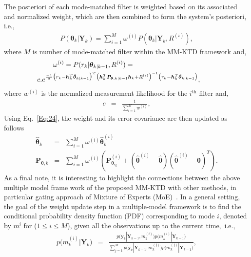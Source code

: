 \documentclass{ieeeaccess}
\def\MMK{\text{MM-KTD}}
\def\k{_{k}}
\def\i{^{i}}
\def\bt{\bm{\theta}}
\def\h{\bm{h}}
\def\P{\bm{P}}
\def\Y{\bm{Y}}
\def\pk{_{k-1}}
\def\kpk{_{k|k-1}}
\def\y{\bm{y}}
\def\i{^{(i)}}
\begin{document}
The posteriori of each mode-matched filter is weighted based on its associated and normalized  weight, which are then combined to form the system's posteriori, i.e.,
%
\begin{eqnarray}
P(\bt\k|\Y\k) =\sum_{i=1}^{M}\omega\i P(\bt\k|\Y\k, R\i), \label{Eq:24}
\end{eqnarray}
%
where $M$ is number of mode-matched filter within the $\MMK$ framework and,
%
\begin{eqnarray} \label{Eq:25}
\lefteqn{\omega\i = P(r\k|\bt\kpk,R\i)=}\\
&& \!\! \!\!\!\!\!\!\!\!\! \!\!\!\!\!\!\!\!\!  c.e^{\frac{-1}{2}\big(r\k-\h\k^T\hat{\bt}\kpk\big)^T\big(\h\k^T\P_{\bt,k|k-1}\h\k+R\i\big)^{-1}\big(r\k-\h\k^T\hat{\bt}\kpk\big)\nonumber},
\end{eqnarray}
%
where $w\i$ is the normalized measurement likelihood for the $i^{\text{th}}$ filter and,
%
\begin{eqnarray} \label{Eq:26}
c &=& \frac{1}{\sum_{i=1}^{M} w\i},
\end{eqnarray}
%
Using Eq.~\eqref{Eq:24}, the weight and its error covariance are then updated as follows
%
\begin{eqnarray}
\!\!\!\!\!\!\!\!\!\!\!\!\hat{\bt}\k &\!\!=\!\!& \sum_{i=1}^{M}\omega\i\hat{\bt}\i\k\\
\!\!\!\!\!\!\!\!\!\!\!\!\P_{\bt,k} &\!\!=\!\!& \sum_{i=1}^{M}\omega\i\left(\P_{\bt,\k}\i + (\hat{\bt}\i-\hat{\bt})(\hat{\bt}\i-\hat{\bt})^T \right).\label{Eq:New28}
\end{eqnarray}
%
As a final note, it is interesting to highlight the connections between the above multiple model frame work of the proposed MM-KTD with other methods, in particular gating approach of Mixture of Experts (MoE)~\cite{Hinton:2017}. In a general setting, the goal of the weight update step in a multiple-model framework is to find the
conditional probability density function (PDF) corresponding to mode $i$, denoted by $m^{i}$ for ($1 \leq i \leq M$), given all the observations up to the current time,~i.e.,
%
\begin{eqnarray}\label{eq:modelProb3}
\!\!\!\!\!\!\!\!p\big(m^{(i)}\k|\Y\k\big) &\!\!\!\!\!=\!\!\!\!&  \frac{p\big(\y\k| \Y\pk, m^{(i)}\k\big) p\big(m^{(i)}\k|\Y\pk\big) }
{\sum_{j=1}^{M} p\big(\y\k| \Y\pk, m\k^{(j)}\big) p\big(m\k^{(j)}|\Y\pk\big)},
\end{eqnarray}
\end{document}
